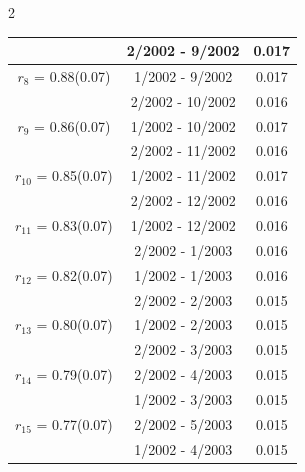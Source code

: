 \begin{multicols}{2}
{\begin{tabular}{ccc}
&        2/2002 -  9/2002 &        0.017  \vspace{-.02in} \\ \hline 
  $r_{ 8}$ = 0.88(0.07) &       1/2002 -  9/2002 &        0.017   \vspace{-.10in} \\  
&        2/2002 - 10/2002 &        0.016  \vspace{-.02in} \\ \hline 
  $r_{ 9}$ = 0.86(0.07) &       1/2002 - 10/2002 &        0.017   \vspace{-.10in} \\  
&        2/2002 - 11/2002 &        0.016  \vspace{-.02in} \\ \hline 
  $r_{10}$ = 0.85(0.07) &       1/2002 - 11/2002 &        0.017   \vspace{-.10in} \\  
&        2/2002 - 12/2002 &        0.016  \vspace{-.02in} \\ \hline 
  $r_{11}$ = 0.83(0.07) &       1/2002 - 12/2002 &        0.016   \vspace{-.10in} \\  
&        2/2002 -  1/2003 &        0.016  \vspace{-.02in} \\ \hline 
  $r_{12}$ = 0.82(0.07) &       1/2002 -  1/2003 &        0.016   \vspace{-.10in} \\  
&        2/2002 -  2/2003 &        0.015  \vspace{-.02in} \\ \hline 
  $r_{13}$ = 0.80(0.07) &       1/2002 -  2/2003 &        0.015   \vspace{-.10in} \\  
&        2/2002 -  3/2003 &        0.015  \vspace{-.02in} \\ \hline 
  $r_{14}$ = 0.79(0.07) &       2/2002 -  4/2003 &        0.015   \vspace{-.10in} \\  
&        1/2002 -  3/2003 &        0.015  \vspace{-.02in} \\ \hline 
  $r_{15}$ = 0.77(0.07) &       2/2002 -  5/2003 &        0.015   \vspace{-.10in} \\  
&        1/2002 -  4/2003 &        0.015  \vspace{-.02in} \\ \hline 

\end{tabular}}
\end{multicols}
